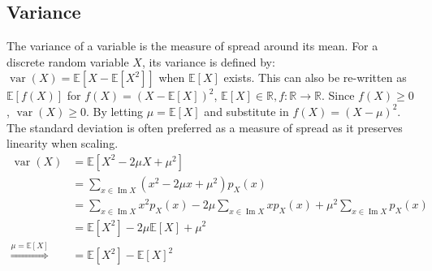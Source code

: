 \documentclass[fontsize=10pt]{article}
\numberwithin{equation}{subsection}
\newcommand{\EE}[1]{\mathbb{E}\left[#1\right]}
\newcommand{\image}{\mathop{\mathrm{Im}}}
\newcommand{\setreal}{\mathbb{R}}
\newcommand{\var}{\mathop{\mathrm{var}}}
\begin{document}
\subsection{Variance}The variance of a variable is the measure of spread around its mean.
For a discrete random variable $X$, its variance is defined by: \(\var(X)=\EE {X-\EE{X^2}}\) when $\EE{X}$ exists.  This can also be re-written as $\EE{f(X)}$ for $f(X)=\left(X-\EE{X}\right)^2$, $\EE{X}\in\setreal, f:\setreal\to\setreal$. Since $f(X)\ge0$, $\var(X)\ge0$.  By letting $\mu=\EE X$ and substitute in $f(X)=\left(X-\mu\right)^2$.  The standard deviation is often preferred as a measure of spread as it preserves linearity when scaling.
\begin{align*}
\var(X)&=\EE{X^2-2\mu X+\mu^2}\\
&=\sum_{x\in\image X}\left(x^2-2\mu x+\mu^2\right)p_X(x)\\
&=\sum_{x\in\image X}x^2p_X(x)-2\mu\sum_{x\in\image X}xp_X(x)+\mu^2\sum_{x\in\image X}p_X(x)\\
&=\EE{X^2}-2\mu\EE X+\mu^2\\
\overset{\mu=\EE{X}}{\Rightarrow}&=\EE{X^2}-\EE{X}^2
\end{align*}
\end{document}
